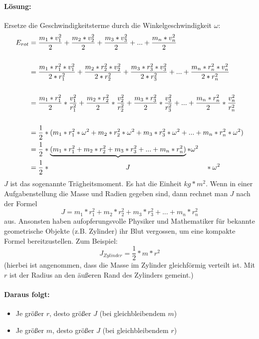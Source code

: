 \documentclass[12pt]{article}
\numberwithin{equation}{subsection}
\begin{document}
	\paragraph{Lösung:}
	Ersetze die Geschwindigkeitsterme durch die Winkelgeschwindigkeit $ \omega $:
	\begin{align}
		E_{rot} &= \dfrac{m_1*v_1^2}{2}+\dfrac{m_2*v_2^2}{2}+\dfrac{m_3*v_3^2}{2}+...+\dfrac{m_n*v_n^2}{2}\\
		\nonumber\\
		&= \dfrac{m_1*r_1^2*v_1^2}{2*r_1^2}+\dfrac{m_2*r_2^2*v_2^2}{2*r_2^2}+\dfrac{m_3*r_3^2*v_3^2}{2*r_3^2}+...+\dfrac{m_n*r_n^2*v_n^2}{2*r_n^2}\\
		\nonumber\\
		&= \dfrac{m_1*r_1^2}{2}*\dfrac{v_1^2}{r_1^2}+\dfrac{m_2*r_2^2}{2}*\dfrac{v_2^2}{r_2^2}+\dfrac{m_3*r_3^2}{2}*\dfrac{v_3^2}{r_3^2}+...+\dfrac{m_n*r_n^2}{2}*\dfrac{v_n^2}{r_n^2}\\
		\nonumber\\
		&= \dfrac{1}{2}*(m_1*r_1^2*\omega^2+m_2*r_2^2*\omega^2+m_3*r_3^2*\omega^2+...+m_n*r_n^2*\omega^2)\\
		&= \dfrac{1}{2}*\underbrace{(m_1*r_1^2+m_2*r_2^2+m_3*r_3^2+...+m_n*r_n^2)}*\omega^2\\
		&= \dfrac{1}{2}* \hspace{3.8cm} J \hspace{3.8cm}*\omega^2
	\end{align}
	$J$ ist das sogenannte Trägheitsmoment. Es hat die Einheit $ kg*m^2 $. Wenn in einer Aufgabenstellung die Masse und Radien gegeben sind, dann rechnet man $J$ nach der Formel
	\begin{equation}
		J = m_1*r_1^2+m_2*r_2^2+m_3*r_3^2+...+m_n*r_n^2
	\end{equation}
	aus. Ansonsten haben aufopferungsvolle Physiker und Mathematiker für bekannte geometrische Objekte (z.B. Zylinder) ihr Blut vergossen, um eine kompakte Formel bereitzustellen. Zum Beispiel:
	\begin{equation}
		J_{Zylinder} = \dfrac{1}{2}*m*r^2
	\end{equation}
	(hierbei ist angenommen, dass die Masse im Zylinder gleichförmig verteilt ist. Mit $ r $ ist der Radius an den äußeren Rand des Zylinders gemeint.)
	\paragraph{Daraus folgt:}
	\begin{itemize}
		\item Je größer $ r $, desto größer $ J $ \quad (bei gleichbleibendem $ m $)
		\item Je größer $ m $, desto größer $ J $ \quad (bei gleichbleibendem $ r $)
	\end{itemize}
\end{document}
